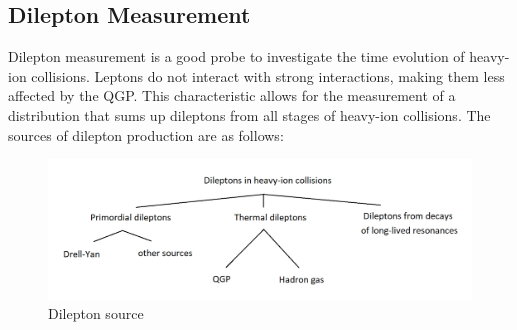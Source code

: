     \subsection{Dilepton Measurement\cite{Geurts:2022xmk}}
        Dilepton measurement is a good probe to investigate the time evolution of heavy-ion collisions. Leptons do not interact with strong interactions, making them less affected by the QGP. This characteristic allows for the measurement of a distribution that sums up dileptons from all stages of heavy-ion collisions. The sources of dilepton production are as follows:   
        
        \begin{figure}[hbtp]
            \centering
            \includegraphics[keepaspectratio, scale=0.3]{fig/1_5_dilepton_source.png}
            \caption{Dilepton source}
            \label{Intro:Dilepton:dilepton_source}
        \end{figure}
        
